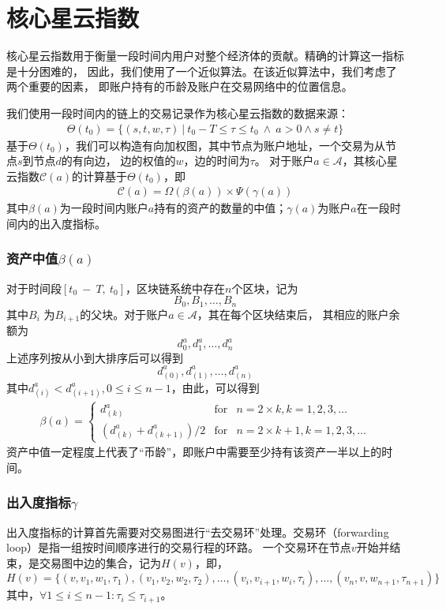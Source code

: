 \section{核心星云指数}
\begin{frame}
	核心星云指数用于衡量一段时间内用户对整个经济体的贡献。精确的计算这一指标是十分困难的，
  因此，我们使用了一个近似算法。在该近似算法中，我们考虑了两个重要的因素， 即账户持有的币龄及账户在交易网络中的位置信息。

  我们使用一段时间内的链上的交易记录作为核心星云指数的数据来源：
  \begin{align}
  \Theta(t_0) = \{(s, t, w, \tau)\ |\ t_0 - T \le \tau \le t_0\ \land \ a > 0 \land s \neq t \}
  \end{align}
  \noindent 基于$\Theta(t_0)$，我们可以构造有向加权图，其中节点为账户地址，一个交易为从节点$s$到节点$d$的有向边，
  边的权值的$w$，边的时间为$\tau$。
  对于账户$a \in \mathcal{A}$，其核心星云指数$\mathcal{C}(a)$的计算基于$\Theta(t_0)$，即
  \begin{align}
  \mathcal{C}(a) = \Omega(\beta(a)) \times{} \Psi(\gamma(a))
  \label{eq:rank}
  \end{align}
  \noindent 其中$\beta(a)$为一段时间内账户$a$持有的资产的数量的中值；$\gamma(a)$为账户$a$在一段时间内的出入度指标。
\end{frame}

\begin{frame}
\frametitle{资产中值$\beta(a)$}
对于时间段$[t_0\ −\ T,\ t_0]$，区块链系统中存在$n$个区块，记为
\[
B_0, B_1, \dots, B_n
\]
\noindent 其中$B_{i}$ 为$B_{i+1}$的父块。对于账户$a \in \mathcal{A}$，其在每个区块结束后，
其相应的账户余额为
\[
d^a_0, d^a_1, \dots, d^a_n
\]
上述序列按从小到大排序后可以得到
\[
d^a_{(0)}, d^a_{(1)}, \dots, d^a_{(n)}
\]
其中$d^a_{(i)} < d^a_{(i+1)}, 0\le i \le {n-1}$，由此，可以得到
\begin{align}
\beta(a) = \left\{ \begin{array}{rcl}
{d^a_{(k)}} & \mbox{for} & n=2\times{}k, k=1, 2, 3, \ldots \\
{(d^a_{(k)} + d^a_{(k+1)})/2} & \mbox{for} & n=2\times{}k + 1, k=1, 2, 3, \ldots
\end{array}\right.
\end{align}
资产中值一定程度上代表了“币龄”，即账户中需要至少持有该资产一半以上的时间。
\end{frame}

\begin{frame}
\frametitle{出入度指标$\gamma$}
出入度指标的计算首先需要对交易图进行“去交易环”处理。交易环（forwarding loop）是指一组按时间顺序进行的交易行程的环路。
一个交易环在节点$v$开始并结束，是交易图中边的集合，记为$H(v)$，即，
\[
H(v) = \{(v, v_1, w_1, \tau_1), (v_1, v_2, w_2, \tau_2), \dots, (v_i, v_{i+1}, w_{i}, \tau_i), \dots, (v_n, v, w_{n+1}, \tau_{n+1})\}
\]
\noindent 其中，$\forall 1\le i \le {n-1} : \tau_i \le \tau_{i+1} $。
\end{frame}

